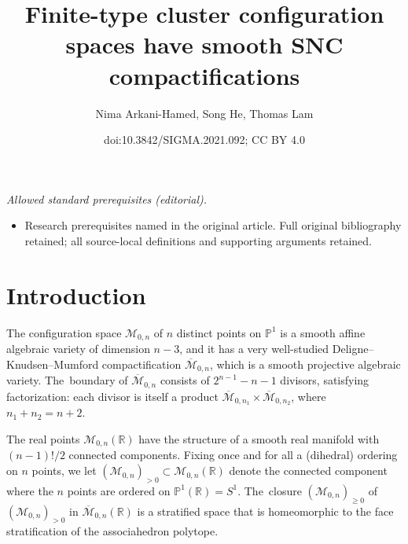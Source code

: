 \documentclass[10pt,a4paper]{amsart}
\title{Finite-type cluster configuration spaces have smooth SNC compactifications}
\author{Nima Arkani-Hamed, Song He, Thomas Lam}
\date{doi:10.3842/SIGMA.2021.092; CC BY 4.0}
\def\R{{\mathbb R}}
\def\M{{\mathcal{M}}}
\def\bM{{\overline {\mathcal{M}}}}
\renewcommand{\P}{{\mathbb P}}
\numberwithin{equation}{section}
\begin{document}
\maketitle
\noindent\textit{Allowed standard prerequisites (editorial).}\begin{itemize}
\item Research prerequisites named in the original article. Full original bibliography retained; all source-local definitions and supporting arguments retained.
\end{itemize}\medskip
\section{Introduction}

\medskip{} The configuration space $\M_{0,n}$ of $n$ distinct points on $\P^1$ is a smooth affine algebraic variety of dimension $n{-}3$, and it has a very well-studied Deligne--Knudsen--Mumford compactification $\bM_{0,n}$, which is a smooth projective algebraic variety. The~boundary of $\bM_{0,n}$ consists of $2^{n{-}1}{-}n{-}1$ divisors, satisfying factorization: each divisor is itself a product $\bM_{0,n_1} \times \bM_{0,n_2}$, where $n_1{+}n_2 =n{+}2$.

The real points $\M_{0,n}(\R)$ have the structure of a smooth real manifold with $(n{-}1)!/2$ connected components. Fixing once and for all a (dihedral) ordering on $n$ points, we let $(\M_{0,n})_{>0} \subset \M_{0,n}(\R)$ denote the connected component where the $n$ points are ordered on $\P^1(\R) = S^1$. The~closure $(\M_{0,n})_{\geq 0}$ of $(\M_{0,n})_{>0}$ in $\bM_{0,n}(\R)$ is a stratified space that is homeomorphic to the face stratification of the associahedron polytope.
\end{document}
